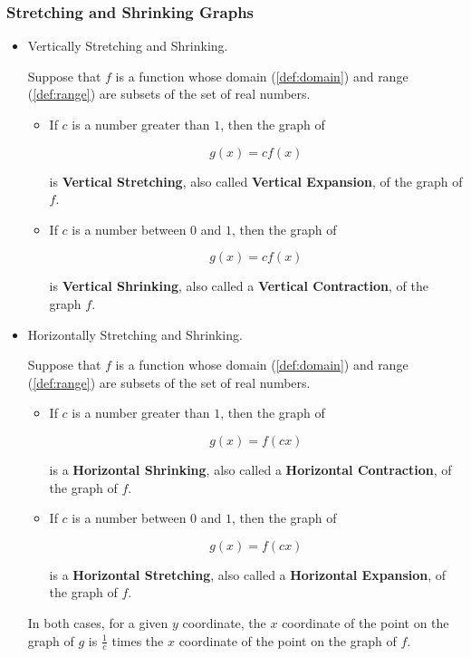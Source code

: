 
\subsubsection{Stretching and Shrinking Graphs}
\label{sub_sub_sec:stretching_and_shrinking_graphs}

\begin{itemize}
  \label{item:stretching_and_shrinking}

  \item Vertically Stretching and Shrinking.

    Suppose that $f$ is a function whose domain (\ref{def:domain}) and range
    (\ref{def:range}) are subsets of the set of real numbers. 

    \begin{itemize}
      \label{item:vertically_stretching_and_shrinking}
    
      \item If $c$ is a number greater than $1$, then the graph of

        \[ g(x) = cf(x) \]
        
        is \textbf{Vertical Stretching}, also called
        \textbf{Vertical Expansion}, of the graph of $f$.

      \item If $c$ is a number between $0$ and $1$, then the graph of

        \[ g(x) = cf(x) \]

        is \textbf{Vertical Shrinking}, also called a \textbf{Vertical
        Contraction}, of the graph $f$.
    \end{itemize}

  \item Horizontally Stretching and Shrinking.

    Suppose that $f$ is a function whose domain (\ref{def:domain}) and range
    (\ref{def:range}) are subsets of the set of real numbers.

    \begin{itemize}
      \label{item:horizontally_stretching_and_shrinking}
    
      \item If $c$ is a number greater than $1$, then the graph of

        \[ g(x) = f(cx) \]
        
        is a \textbf{Horizontal Shrinking}, also called a \textbf{Horizontal
        Contraction}, of the graph of $f$.

      \item If $c$ is a number between $0$ and $1$, then the graph of

        \[ g(x) = f(cx) \]

        is a \textbf{Horizontal Stretching}, also called a \textbf{Horizontal
        Expansion}, of the graph of $f$.
    \end{itemize}

    In both cases, for a given $y$ coordinate, the $x$ coordinate of the point
    on the graph of $g$ is $\frac{1}{c}$ times the $x$ coordinate of the point
    on the graph of $f$.
\end{itemize}

